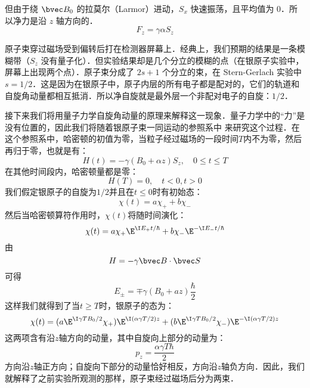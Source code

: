 但由于绕 $\bvec B_0$ 的拉莫尔（Larmor）进动，$S_x$ 快速振荡，且平均值为 $0$．所以净力是沿 $z$ 轴方向的．
\begin{equation}
F_z=\gamma\alpha S_z
\end{equation}

原子束穿过磁场受到偏转后打在检测器屏幕上．经典上，我们预期的结果是一条模糊带（$S_z$ 没有量子化）．但实验结果却是几个分立的模糊的点（在银原子实验中，屏幕上出现两个点）．原子束分成了 $2s+1$ 个分立的束，在 Stern-Gerlach 实验中 $s=1/2$．这是因为在银原子中，原子内层的所有电子都是配对的，它们的轨道和自旋角动量都相互抵消．所以净自旋就是最外层一个非配对电子的自旋：$1/2$．

接下来我们将用量子力学自旋角动量的原理来解释这一现象．量子力学中的“力”是没有位置的，因此我们将随着银原子束一同运动的参照系中
来研究这个过程．在这个参照系中，哈密顿的初值为零，当粒子经过磁场的一段时间$T$内不为零，然后再归于零，也就是有：
\begin{equation}
H(t)=-\gamma(B_0+\alpha z)S_z, \quad 0\leq t\leq T
\end{equation}
在其他时间段内，哈密顿量都是零：
\begin{equation}
H(T)=0, \quad t<0,t>0
\end{equation}
我们假定银原子的自旋为$1/2$并且在$t\leq 0$时有初始态：
\begin{equation}
\chi(t)=a\chi_++b\chi_-
\end{equation}
然后当哈密顿算符作用时，$\chi(t)$将随时间演化：
\begin{equation}
\chi(t)=a\chi_+\E^{\I E_+ t/\hbar} + b\chi_-\E^{-\I E_- t/\hbar}
\end{equation}
由
\begin{equation}
H=-\gamma\bvec B\cdot \bvec S
\end{equation}
可得
\begin{equation}
E_\pm = \mp \gamma(B_0+az)\frac{\hbar}{2}
\end{equation}
这样我们就得到了当$t\geq T$时，银原子的态为：
\begin{equation}
\chi(t)=(a\E^{\I\gamma TB_0/2}\chi_+)\E^{\I(\alpha\gamma T/2)z} + (b\E^{\I\gamma TB_0/2}\chi_-)\E^{-\I(\alpha\gamma T/2)z} 
\end{equation}
这两项含有沿$ z $轴方向的动量，其中自旋向上部分的动量为：
\begin{equation}
p_z=\frac{\alpha\gamma T\hbar}{2}
\end{equation}
方向沿$ z $轴正方向；自旋向下部分的动量恰好相反，方向沿$ z $轴负方向．因此，我们就解释了之前实验所观测的那样，原子束经过磁场后分为两束．

